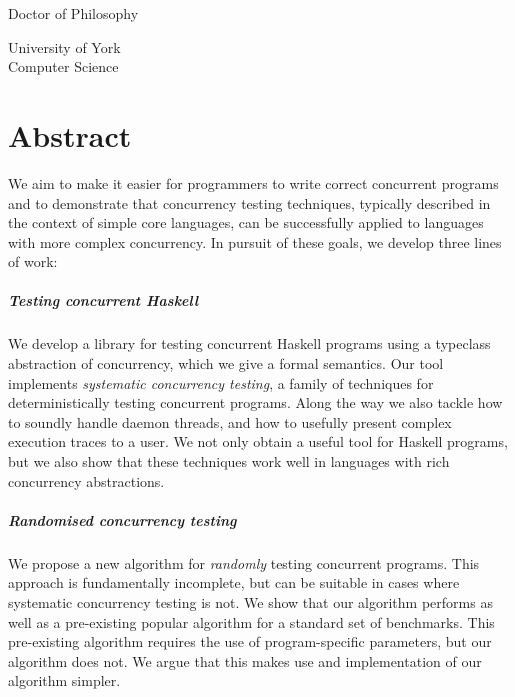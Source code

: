 \begin{titlepage}
  \begin{center}
    \makeatletter

    {\fontsize{28pt}{30pt}\selectfont \@title \par}

    \vspace{1.3cm}

    \Large

    \@author

    \vfill

    Doctor of Philosophy

    \vspace{1cm}

    University of York\\
    Computer Science

    \vspace{1cm}

    \@date
    \makeatother
  \end{center}
\end{titlepage}

\chapter*{Abstract}

We aim to make it easier for programmers to write correct concurrent
programs and to demonstrate that concurrency testing techniques,
typically described in the context of simple core languages, can be
successfully applied to languages with more complex concurrency.  In
pursuit of these goals, we develop three lines of work:

\paragraph{Testing concurrent Haskell}
We develop a library for testing concurrent Haskell programs using a
typeclass abstraction of concurrency, which we give a formal
semantics.  Our tool implements \emph{systematic concurrency testing},
a family of techniques for deterministically testing concurrent
programs.  Along the way we also tackle how to soundly handle daemon
threads, and how to usefully present complex execution traces to a
user.  We not only obtain a useful tool for Haskell programs, but we
also show that these techniques work well in languages with rich
concurrency abstractions.

\paragraph{Randomised concurrency testing}
We propose a new algorithm for \emph{randomly} testing concurrent
programs.  This approach is fundamentally incomplete, but can be
suitable in cases where systematic concurrency testing is not.  We
show that our algorithm performs as well as a pre-existing popular
algorithm for a standard set of benchmarks.  This pre-existing
algorithm requires the use of program-specific parameters, but our
algorithm does not.  We argue that this makes use and implementation
of our algorithm simpler.

